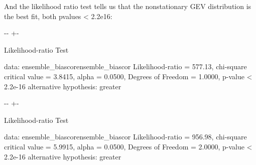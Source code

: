 \documentclass[letterpaper,10pt,english]{sphinxmanual}
\newlength\nbsphinxcodecellspacing
\begin{document}
And the likelihood ratio test tells us that the nonstationary GEV distribution is the best fit, both p\sphinxhyphen{}values \textless{} 2.2e\sphinxhyphen{}16:

{
\begin{sphinxVerbatim}[commandchars=\\\{\}]
\llap{\color{nbsphinxin}[13]:\,\hspace{\fboxrule}\hspace{\fboxsep}}
 
\end{sphinxVerbatim}
}

{

\kern-\sphinxverbatimsmallskipamount\kern-\baselineskip
\kern+\FrameHeightAdjust\kern-\fboxrule
\vspace{\nbsphinxcodecellspacing}

\begin{sphinxVerbatim}[commandchars=\\\{\}]

        Likelihood-ratio Test

data:  ensemble\_biascorensemble\_biascor
Likelihood-ratio = 577.13, chi-square critical value = 3.8415, alpha =
0.0500, Degrees of Freedom = 1.0000, p-value < 2.2e-16
alternative hypothesis: greater

\end{sphinxVerbatim}
}

{

\kern-\sphinxverbatimsmallskipamount\kern-\baselineskip
\kern+\FrameHeightAdjust\kern-\fboxrule
\vspace{\nbsphinxcodecellspacing}

\begin{sphinxVerbatim}[commandchars=\\\{\}]

        Likelihood-ratio Test

data:  ensemble\_biascorensemble\_biascor
Likelihood-ratio = 956.98, chi-square critical value = 5.9915, alpha =
0.0500, Degrees of Freedom = 2.0000, p-value < 2.2e-16
alternative hypothesis: greater

\end{sphinxVerbatim}
}
\end{document}
